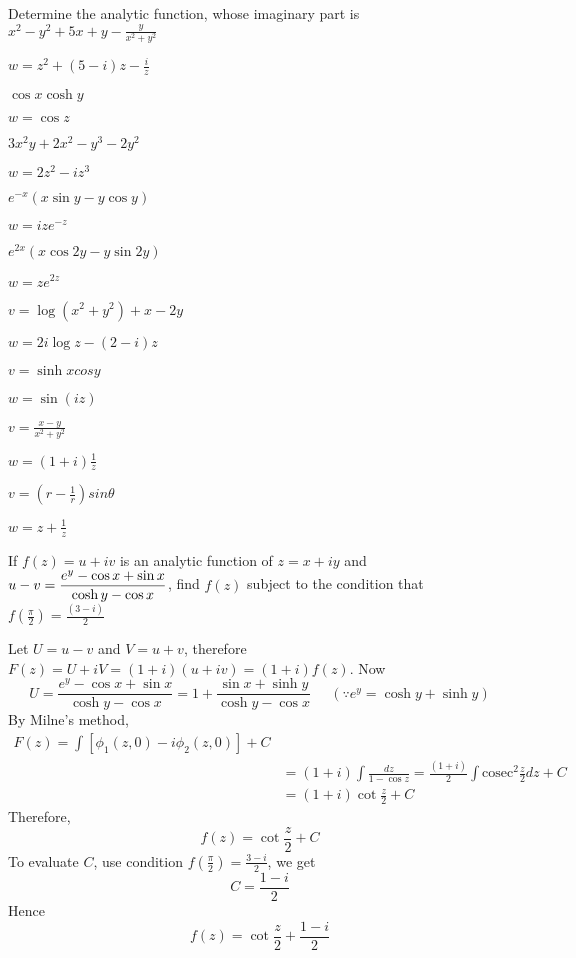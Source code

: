 \begin{problems}
\prob Determine the analytic function, whose imaginary part is  
        \subprob  $x^2-y^2+5x+y-\frac{y}{x^2+y^2}$  
        \begin{sol}
        $w=z^{2}+(5-i)z-\frac{i}{z}$
        \end{sol}
        \subprob  $\cos x \cosh y$
        \begin{sol}
                $w=\cos z$
        \end{sol}
        \subprob  $3x^2y+2x^2-y^3-2y^2$  
        \begin{sol}
        $w=2z^{2}-iz^{3}$
        \end{sol}
        \subprob  $e^{-x}(x \sin y - y \cos y)$  
        \begin{sol}
        $w=ize^{-z}$
        \end{sol}
        \subprob  $e^{2x}(x \cos 2y - y \sin 2y)$  
        \begin{sol}
        $w=ze^{2z}$
        \end{sol}
        \subprob  $v=\log(x^2+y^2)+x-2y$  
        \begin{sol}
        $w=2i\log z-(2-i)z$
        \end{sol}
        \subprob  $v=\sinh x cos y$  
        \begin{sol}
        $w=\sin(iz)$
        \end{sol}
        \subprob  $v=\frac{x-y}{x^2+y^2}$  
        \begin{sol}
        $w=(1+i)\frac{1}{z}$
        \end{sol}
        \subprob  $v= \left(r-\frac{1}{r}\right) sin\theta$ 
        \begin{sol}
        $w=z+\frac{1}{z}$
        \end{sol} 
\prob  If $f(z)= u+iv$ is an analytic function of $z=x+iy$ and $\displaystyle u-v = \frac{e^y-\cos x+ \sin x}{\cosh y- \cos x}$, find $f(z)$ subject to the condition that $f \left(\frac{\pi}{2}\right) = \frac{(3-i)}{2}$ 
\begin{sol}
Let $U=u-v$ and $V=u+v$, therefore $F(z)=U+iV =(1+i)(u+iv)=(1+i)f(z)$. Now
\[U= \frac{e^y-\cos x+ \sin x}{\cosh y- \cos x} = 1+\frac{\sin x+ \sinh y}{\cosh y- \cos x}\;\;\;\;\;(\because e^y=\cosh y + \sinh y)\]
By Milne's method,
\begin{align*}
        F(z) = \int [\phi_1(z,0)-i\phi_2(z,0)] +C\\
        &=(1+i) \int \frac{dz}{1-\cos z} = \frac{(1+i)}{2} \int \text{cosec}^2\frac{z}{2} dz +C\\
        &=(1+i) \cot \frac{z}{2}  + C
\end{align*}
Therefore,
\[f(z) = \cot  \frac{z}{2} + C \]
To evaluate $C$, use condition $f\left(\frac{\pi}{2}\right)=\frac{3-i}{2}$, we get
\[C=\frac{1-i}{2}\]
Hence
\[f(z) = \cot  \frac{z}{2} + \frac{1-i}{2} \]


\end{sol}
\end{problems}
